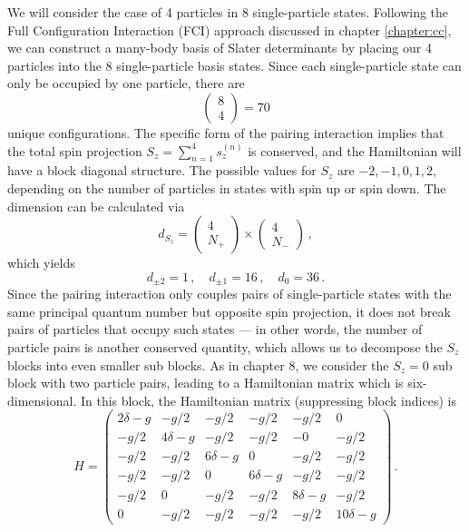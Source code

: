 {We will consider the case of 4 particles in 8 single-particle states. Following
the Full Configuration Interaction (FCI) approach discussed in chapter \ref{chapter:cc},
we can construct a many-body basis of Slater determinants by placing
our 4 particles into the 8 single-particle basis states. Since each
single-particle state can only be occupied by one particle, there are
\begin{equation}
  \begin{pmatrix} 8 \\ 4\end{pmatrix} = 70
\end{equation}
unique configurations. The specific form of the pairing interaction
implies that the total spin projection $S_z = \sum_{n=1}^4 s_z^{(n)}$ 
is conserved, and the Hamiltonian will have a block diagonal structure.
The possible values for $S_z$ are $-2,-1,0,1,2$, depending on the number
of particles in states with spin up or spin down. The dimension can be
calculated via
\begin{equation}
 d_{S_z} = \begin{pmatrix} 4 \\ N_{+}\end{pmatrix} \times 
           \begin{pmatrix} 4 \\ N_{-}\end{pmatrix}\,,
\end{equation}
which yields 
\begin{equation}
 d_{\pm 2} = 1\,, \quad d_{\pm 1} = 16\,, \quad d_{0} = 36\,.
\end{equation}
Since the pairing interaction only couples pairs of single-particle 
states with the same principal quantum number but opposite spin
projection, it does not break pairs of particles that occupy such 
states --- in other words, the number of particle pairs is another
conserved quantity, which allows us to decompose the $S_z$ blocks
into even smaller sub blocks. As in chapter 8, we consider the $S_z=0$
sub block with two particle pairs, leading to a Hamiltonian matrix which is six-dimensional. 
In this
block, the Hamiltonian matrix (suppressing
block indices) is 
\begin{equation}\label{eq:def_h_matrix}
  H = \begin{pmatrix}
  2\delta -g  &      -g/2  &       -g/2 &      -g/2 &      -g/2 &        0 \\ 
         -g/2 & 4\delta -g &       -g/2 &      -g/2 &        -0 &     -g/2 \\ 
         -g/2 &       -g/2 & 6\delta -g &         0 &      -g/2 &     -g/2 \\ 
         -g/2 &       -g/2 &          0 & 6\delta-g &      -g/2 &     -g/2 \\ 
         -g/2 &          0 &       -g/2 &      -g/2 & 8\delta-g &     -g/2 \\ 
            0 &       -g/2 &       -g/2 &      -g/2 &      -g/2 & 10\delta -g
  \end{pmatrix}\,.
\end{equation}

}
